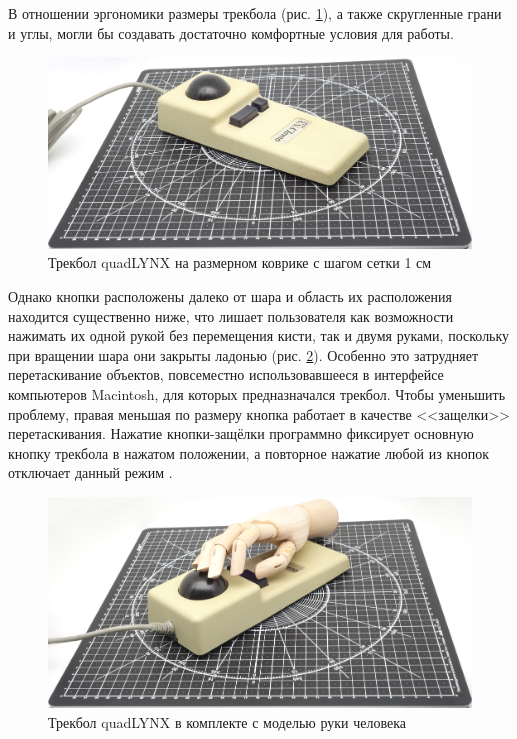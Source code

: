 \documentclass[11pt, a4paper]{article}
\begin{document}
В отношении эргономики размеры трекбола (рис. \ref{fig:quadLYNXSize}), а также скругленные грани и углы, могли бы создавать достаточно комфортные условия для работы.

\begin{figure}[h]
    \centering
    \includegraphics[scale=0.4]{1986_honeywell_asher_quadlynx_trackball/size_30.jpg}
    \caption{Трекбол quadLYNX на размерном коврике с шагом сетки 1 см}
    \label{fig:quadLYNXSize}
\end{figure}

Однако кнопки расположены далеко от шара  и область их расположения находится существенно ниже, что лишает пользователя как возможности нажимать их одной рукой без перемещения кисти, так и двумя руками, поскольку при вращении шара они закрыты ладонью (рис. \ref{fig:quadLYNXHand}). Особенно это затрудняет перетаскивание объектов, повсеместно использовавшееся в интерфейсе компьютеров Macintosh, для которых предназначался трекбол. Чтобы уменьшить проблему, правая меньшая по размеру кнопка работает в качестве <<защелки>> перетаскивания. Нажатие кнопки-защёлки программно фиксирует основную кнопку трекбола в нажатом положении, а повторное нажатие любой из кнопок отключает данный режим \cite{bible}.

\begin{figure}[h]
    \centering
    \includegraphics[scale=0.4]{1986_honeywell_asher_quadlynx_trackball/hand_30.jpg}
    \caption{Трекбол quadLYNX в комплекте с моделью руки человека}
    \label{fig:quadLYNXHand}
\end{figure}
\end{document}
